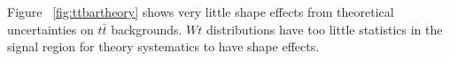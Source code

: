 %

Figure ~\ref{fig:ttbartheory} shows very little shape effects from theoretical uncertainties on $t\bar{t}$ backgrounds. $Wt$ distributions have too little statistics in the signal region for theory systematics to have shape effects.

